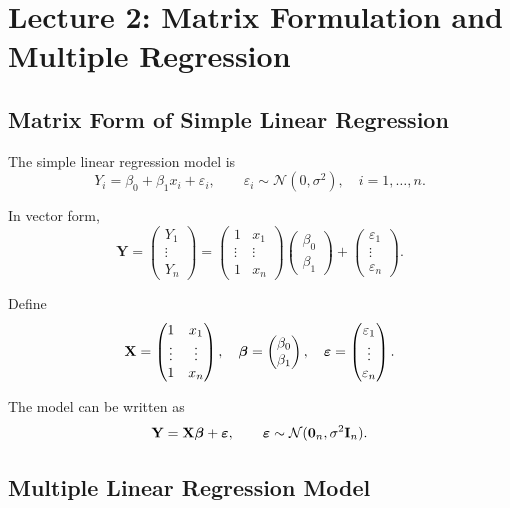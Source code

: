 \section{Lecture 2: Matrix Formulation and Multiple Regression}

\subsection{Matrix Form of Simple Linear Regression}

The simple linear regression model is
\[
Y_i = \beta_0 + \beta_1 x_i + \varepsilon_i,
\qquad \varepsilon_i \sim \mathcal{N}(0,\sigma^2),
\quad i = 1,\dots,n.
\]

In vector form,
\[
\mathbf{Y}
=
\begin{pmatrix}
Y_1\\
\vdots\\
Y_n
\end{pmatrix}
=
\begin{pmatrix}
1 & x_1\\
\vdots & \vdots\\
1 & x_n
\end{pmatrix}
\begin{pmatrix}
\beta_0\\
\beta_1
\end{pmatrix}
+
\begin{pmatrix}
\varepsilon_1\\
\vdots\\
\varepsilon_n
\end{pmatrix}.
\]

Define
\[
\mathbf{X}
=
\begin{pmatrix}
1 & x_1\\
\vdots & \vdots\\
1 & x_n
\end{pmatrix},
\quad
\boldsymbol{\beta}
=
\begin{pmatrix}
\beta_0\\
\beta_1
\end{pmatrix},
\quad
\boldsymbol{\varepsilon}
=
\begin{pmatrix}
\varepsilon_1\\
\vdots\\
\varepsilon_n
\end{pmatrix}.
\]

The model can be written as
\[
\mathbf{Y} = \mathbf{X}\boldsymbol{\beta} + \boldsymbol{\varepsilon},
\qquad
\boldsymbol{\varepsilon} \sim \mathcal{N}(\mathbf{0}_n, \sigma^2 \mathbf{I}_n).
\]

\subsection{Multiple Linear Regression Model}

